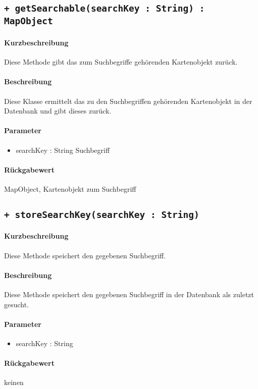 \subsection{\texttt{+ getSearchable(searchKey : String) : MapObject}}%
\paragraph*{Kurzbeschreibung}
Diese Methode gibt das zum Suchbegriffe gehörenden Kartenobjekt zurück.
\paragraph*{Beschreibung}
Diese Klasse ermittelt das zu den Suchbegriffen gehörenden Kartenobjekt in der Datenbank und gibt dieses zurück.
\paragraph*{Parameter}
\begin{itemize}
    \item searchKey : String Suchbegriff
\end{itemize}
\paragraph*{Rückgabewert}
MapObject, Kartenobjekt zum Suchbegriff

\subsection{\texttt{+ storeSearchKey(searchKey : String)}}%
\paragraph*{Kurzbeschreibung}
Diese Methode speichert den gegebenen Suchbegriff.
\paragraph*{Beschreibung}
Diese Methode speichert den gegebenen Suchbegriff in der Datenbank als zuletzt gesucht.
\paragraph*{Parameter}
\begin{itemize}
    \item searchKey : String
\end{itemize}
\paragraph*{Rückgabewert}
keinen

